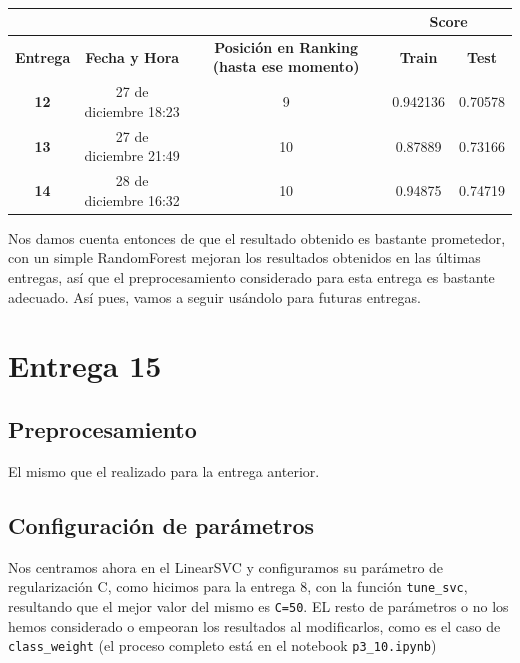 \documentclass[a4paper,11pt]{article}
\begin{document}
  \begin{table}[htbp]
  	\caption{}\begin{center}
  	\begin{tabular}{|c|c|c|c|c|}
  		\hline
  		\multicolumn{1}{|l|}{\textbf{}} & \textbf{} & \textbf{} & \multicolumn{ 2}{c|}{\textbf{Score}} \\ \hline
  		\textbf{Entrega} & \textbf{Fecha y Hora} & \textbf{Posición en Ranking (hasta ese momento)} & \textbf{Train} & \textbf{Test} \\ \hline
  		\textbf{12} & 27 de diciembre 18:23 & 9 & 0.942136 & 0.70578 \\ \hline
  		\textbf{13} & 27 de diciembre 21:49 & 10 & 0.87889 & 0.73166 \\ \hline
  		\textbf{14} & 28 de diciembre 16:32  & 10 & 0.94875 & 0.74719 \\ \hline
  	\end{tabular}\end{center}
  	\label{}
  \end{table}
  
  Nos damos cuenta entonces de que el resultado obtenido es bastante prometedor, con un simple RandomForest mejoran los resultados obtenidos en las últimas entregas, así que el preprocesamiento considerado para esta entrega es bastante adecuado. Así pues, vamos a seguir usándolo para futuras entregas. 
  \section{Entrega 15}
  \subsection{Preprocesamiento}
  
  El mismo que el realizado para la entrega anterior.
  
  \subsection{Configuración de parámetros}
  
  Nos centramos ahora en el LinearSVC y configuramos su parámetro de regularización C, como hicimos para la entrega 8, con la función \texttt{tune_svc}, resultando que el mejor valor del mismo es \texttt{C=50}. EL resto de parámetros o no los hemos considerado o empeoran los resultados al modificarlos, como es el caso de \texttt{class_weight}
  (el proceso completo está en el notebook \texttt{p3_10.ipynb})
  
\end{document}
